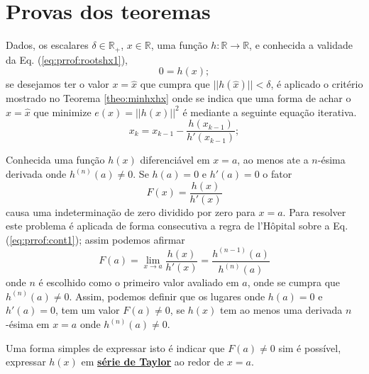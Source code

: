 \section{Provas dos teoremas}
 
\begin{myproofT}\label{proof:theo:rootshx}
Dados,
os escalares $\delta \in \mathbb{R}_+$, 
$x \in \mathbb{R}$, 
uma função $h:\mathbb{R} \rightarrow \mathbb{R}$, e 
conhecida a validade da Eq. (\ref{eq:prrof:rootshx1}),
\begin{equation}\label{eq:prrof:rootshx1}
0=h(x);
\end{equation}
se desejamos ter o valor $x=\hat{x}$ que cumpra que $||h(\hat{x})||<\delta$, 
é aplicado o critério mostrado no Teorema \ref{theo:minhxhx} onde se indica que uma forma de achar o 
$x=\hat{x}$ que minimize $e(x)=||h(x)||^2$ é mediante a seguinte equação iterativa.  
\begin{equation}\label{eq:prrof:rootshx1:2}
x_{k}=x_{k-1}-\frac{h(x_{k-1})}{h'(x_{k-1})};
\end{equation}

\end{myproofT}

\begin{myproofT}\label{proof:theo:cont:rootshx}
Conhecida uma função $h(x)$  diferenciável em $x=a$, ao menos ate a $n$-ésima derivada onde $h^{(n)}(a)\neq 0$.
Se $h(a)=0$ e $h'(a)=0$ o fator
\begin{equation}\label{eq:prrof:cont1}
F(x)=\frac{h(x)}{h'(x)}
\end{equation}
causa uma indeterminação de zero dividido por zero para $x=a$.
Para resolver este problema é aplicada de forma consecutiva a regra de l'Hôpital
sobre a Eq. (\ref{eq:prrof:cont1}); assim podemos afirmar
\begin{equation}\label{eq:prrof:cont2}
F(a)=\lim_{x\rightarrow a}\frac{h(x)}{h'(x)}=\frac{h^{(n-1)}(a)}{h^{(n)}(a)}
\end{equation}
onde $n$ é escolhido como o primeiro valor avaliado em $a$, 
onde se cumpra que $h^{(n)}(a)\neq 0$. 
Assim, podemos definir que os lugares onde $h(a)=0$ e $h'(a)=0$,
 tem um valor $F(a)\neq 0$,
se $h(x)$ tem ao menos uma derivada $n$-ésima em $x=a$ onde $h^{(n)}(a)\neq 0$.

Uma forma simples de expressar isto é indicar que $F(a)\neq 0$ sim é possível,
expressar $h(x)$ em \hyperref[def:taylor]{\textbf{série de Taylor}} ao redor de $x=a$. 
\end{myproofT}

